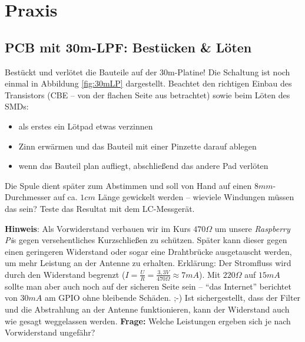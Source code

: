\section*{Praxis}

\subsection*{PCB mit 30m-LPF: Bestücken \& Löten}

Bestückt und verlötet die Bauteile auf der 30m-Platine! Die Schaltung ist noch
einmal in Abbildung \ref{fig:30mLP} dargestellt. Beachtet den richtigen Einbau
des Transistors (CBE -- von der flachen Seite aus betrachtet) sowie beim Löten
des SMDs:

\begin{itemize}
    \item als erstes ein Lötpad etwas verzinnen
    \item Zinn erwärmen und das Bauteil mit einer Pinzette darauf ablegen
    \item wenn das Bauteil plan aufliegt, abschließend das andere Pad verlöten
\end{itemize}



Die Spule dient später zum Abstimmen und soll von Hand auf einen $8
mm$-Durchmesser auf ca. $1 cm$ Länge gewickelt werden -- wieviele Windungen
müssen das sein? Teste das Resultat mit dem LC-Messgerät.

\textbf{Hinweis}: Als Vorwiderstand verbauen wir im Kurs $470 \Omega$ um unsere
\emph{Raspberry Pi}s gegen versehentliches Kurzschließen zu schützen. Später kann dieser
gegen einen geringeren Widerstand oder sogar eine Drahtbrücke ausgetauscht
werden, um mehr Leistung an der Antenne zu erhalten. Erklärung: Der Stromfluss
wird durch den Widerstand begrenzt ($I = \frac{U}{R} = \frac{3,3 V}{470 \Omega}
\approx 7 mA$). Mit $220 \Omega$ auf $15 mA$ sollte man aber auch noch auf der
sicheren Seite sein -- "`das Internet"' berichtet von $30 mA$ am GPIO ohne
bleibende Schäden. ;-) Ist sichergestellt, dass der Filter und die Abstrahlung
an der Antenne funktionieren, kann der Widerstand auch wie gesagt weggelassen
werden. \textbf{Frage:} Welche Leistungen ergeben sich je nach Vorwiderstand
ungefähr?

